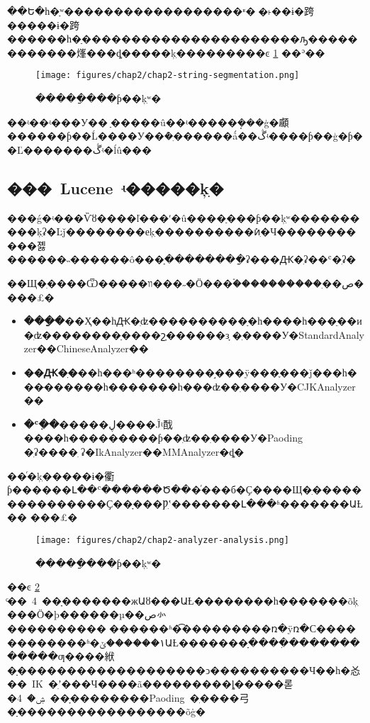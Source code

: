 ��Ե�һ�ִַʷ������������������ʶ�𷨣�˫��ɨ�跨�����ɨ�跨������һ�ַ����������������������ԡ������������㷨���ȡ�����ķִ���������ͼ \ref{fig:string_segmentation} ��ʾ��

    \begin{figure}[htbp]
        \centering
        \texttt{[image: figures/chap2/chap2-string-segmentation.png]}
        \vspace{-1em}
        \caption{�����ַ���ƥ��ķִʷ�}
        \label{fig:string_segmentation}
    \end{figure}

��ʵ��ʵ���У��󲿷ִַ�����û��ʵ�����ܴ���ģ�顣������ƥ��Ĺ����У��ܶ�ִ������ǻ��ڴʵ����ƥ��ģ�ƥ��Ľ�������ڴʵ�ĺû���

\subsection{���~Lucene~ʵ�����ķִ�}

���ǵ�ʵ���Ѷȣ����ľ���ʹ�û����ַ���ƥ��ķִʷ����������ķִʡ�Ŀǰ��������еķִ����������ܺͷִ�Ч�����������졣������˵������ô���ִַ��������ִַʡ���Ԫ�ִʡ��ʿ�ִʡ�

��Щ�ִ����Ѿ�����װ���˶�Ӧ���࣬����������ִ��ص����£�

\begin{itemize}
  \item \textbf{���ִַ�}��Ҳ��һԪ�ִʣ����������ַ�һ����һ���ֵ��и�ִʣ��������ַ����շָ������зָ�ִ����У�StandardAnalyzer��ChineseAnalyzer��
  \item \textbf{��Ԫ�ִ�}��һ���ʰ��������֣���ÿ���ֶ���ǰ���һ���ּ������һ�������һ���ʣ��ִ����У�CJKAnalyzer��
  \item \textbf{�ʿ�ִ�}�����ڸ����Ĵʵ䣬����һ���������ƥ��ִʣ��ִ����У�Paoding �ִʡ����׷ִʡ�IkAnalyzer��MMAnalyzer�ȡ�
\end{itemize}

��ͬ�ķִ�����ɨ�衢ƥ������Լ��ʿ������Ծ���ͬ���б�Ҫ����Щ�ִ���������������Ҫ��ָ���Ƿִʽ�������Լ���ʱ�������ԱȽ�� \cite{chinese_segmentation_2} ���£�

    \begin{figure}[htbp]
        \centering
        \texttt{[image: figures/chap2/chap2-analyzer-analysis.png]}
        \vspace{-1em}
        \caption{�����ַ���ƥ��ķִʷ�}
        \label{fig:segmentation_analysis}
    \end{figure}

��ͼ \ref{fig:segmentation_analysis} ͨ��~4~��ָ�������жԱȣ���ԱȽ��������һ�������õķִ���Ӧ�þ������µ��ص㣺����������ࡢ������ʱ�͡���������ռ�ÿռ�С������������ʱ�١������ݶԱȽ�������ָ����ִ������������ƣ����絥�ִַ�������������������ͻ����������Ч��һ�㣻��~IK~�ִʼ���Ч����ã���������ȴ�����롣�ۺ�~4~��ָ��������Paoding~�ִ����⼸�ִַ�����������������õġ�

